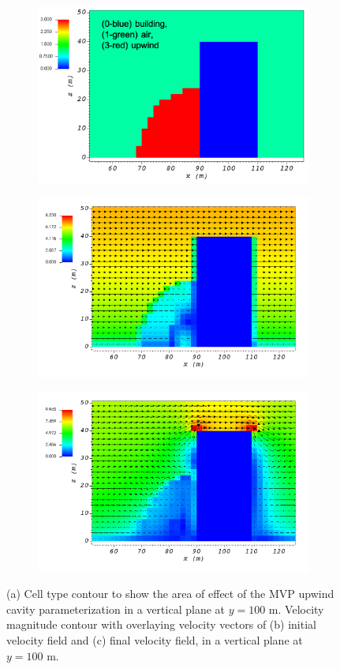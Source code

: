 \begin{figure}[H]
    \centering
    \begin{subfigure}{\textwidth}
    \centering
    \includegraphics[width=10.3cm,keepaspectratio]{Images/upwind_y_100_2_init_icell.png}
    \caption{}
    \end{subfigure}
    \begin{subfigure}{\textwidth}
    \centering
    \includegraphics[width=11.0cm,keepaspectratio]{Images/upwind_y_100_2_init_vel.png}
    \caption{}
    \end{subfigure}
    \begin{subfigure}{\textwidth}
    \centering
    \includegraphics[width=11.0cm,keepaspectratio]{Images/upwind_y_100_2_final.png}
    \caption{}
    \end{subfigure}
    \caption{(a) Cell type contour to show the area of effect of the MVP upwind cavity parameterization in a vertical plane at $y=100$ m. Velocity magnitude contour with overlaying velocity vectors of (b) initial velocity field and (c) final velocity field, in a vertical plane at $y=100$ m.}
\end{figure}

